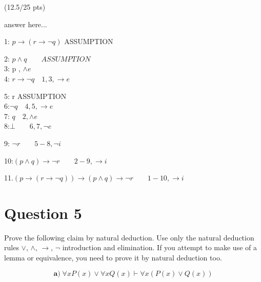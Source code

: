 \documentclass[a4paper,12pt]{article}
\newcommand\tab[1][1cm]{\hspace*{#1}}
\begin{document}
\hfill \small{(12.5/25 pts)}\\
\newpage
\begin{tcolorbox}
answer here...\\
\begin{tcolorbox}
1: $ p\rightarrow (r \rightarrow \neg q)$ \quad \quad ASSUMPTION\\
\begin{tcolorbox}
2: $ p \land q  \quad \quad ASSUMPTION $\\
3: p \quad {}, $\land e$\\
4: $r\rightarrow \neg q \quad 1,3, \rightarrow e$\\
\begin{tcolorbox}
5: r \quad ASSUMPTION\\
6:$ \neg q \quad 4,5,\rightarrow e$ \\
7: $q \quad 2, \land e$\\
8:$ \bot \quad \quad 6,7,\neg e$\\
\end{tcolorbox}
9: $\neg r \quad \quad  5-8,\neg i $\\
\end{tcolorbox}
10:$(p \land q)\rightarrow \neg r \quad \quad 2-9, \rightarrow i$\\
\end{tcolorbox}
11.$ (p\rightarrow (r \rightarrow \neg q))\rightarrow (p \land q)\rightarrow \neg r \quad \quad 1-10, \rightarrow i$

\vspace{1cm} %
\end{tcolorbox}

\section*{Question 5 \hfill {}}
\tab Prove the following claim by natural deduction. Use only the natural deduction rules $\vee$, $\wedge$, $\rightarrow$, $\neg$ introduction and elimination. If you attempt to make use of a lemma or equivalence, you need to prove it by natural deduction too.


\begin{equation*}
    \textbf{a)} \; \forall x P(x) \vee \forall x Q(x) \vdash \forall x (P(x) \vee Q(x)) 
\end{equation*}
\end{document}
